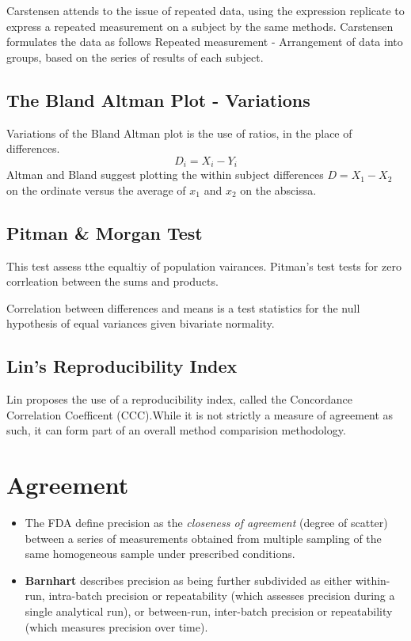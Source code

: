\documentclass{report}
\begin{document}
Carstensen attends to the issue of repeated data, using the
expression replicate to express a repeated measurement on a
subject by the same methods. Carstensen formulates the data as
follows Repeated measurement - Arrangement of data into groups,
based on the series of results of each subject.

\subsection{The Bland Altman Plot - Variations}
Variations of the Bland Altman plot is the use of ratios, in the
place of differences.
\begin{equation}
D_{i} = X_{i} - Y_{i}   \label{BA01}
\end{equation}
Altman and Bland suggest plotting the within subject differences $
D = X_{1} - X_{2} $ on the ordinate versus the average of $x_{1}$
and  $x_{2}$ on the abscissa.
\subsection{Pitman \& Morgan Test} This test assess tthe equaltiy
of population vairances. Pitman's test tests for zero corrleation
between the sums and products.

Correlation between differences and means is a test statistics for
the null hypothesis of equal variances given bivariate normality.
\subsection{Lin's Reproducibility Index} Lin proposes the use of a
reproducibility index, called the Concordance Correlation
Coefficent (CCC).While it is not strictly a measure of agreement
as such, it can form part of an overall method comparision
methodology.




\newpage
\section{Agreement}
\begin{itemize}
\item The FDA define precision as the \textit{closeness of agreement} (degree of
 scatter) between a series of measurements obtained from multiple
 sampling of the same homogeneous sample under prescribed
 conditions. 
\item \textbf{Barnhart} describes precision as being further
 subdivided as either within-run, intra-batch precision or
 repeatability (which assesses precision during a single analytical
 run), or between-run, inter-batch precision or repeatability
(which measures precision over time).
\end{itemize}
\end{document}
